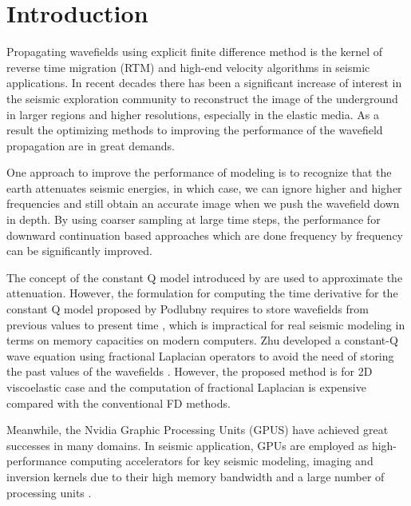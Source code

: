 \documentclass{paris17}
\begin{document}
\section{Introduction}

Propagating wavefields using explicit finite difference method is the kernel of reverse time migration (RTM) and high-end velocity algorithms in seismic applications. In recent decades there has been a significant increase of interest in the seismic exploration community to reconstruct the image of the underground in larger regions and higher resolutions, especially in the elastic media. As a result the optimizing methods to improving the performance of the wavefield propagation are in great demands.




One approach to improve the performance of modeling is to recognize that the earth attenuates seismic energies, in which case, we can ignore higher and higher frequencies and still obtain an accurate image\cite[]{Clapp.sep.111.bob3} when we push the wavefield down in depth. By using coarser sampling at large time steps,  the performance for downward continuation based approaches which are done frequency by frequency can be significantly improved.

The concept of the constant Q model introduced by \cite{Kjartansson.sep.23} are used to approximate the attenuation. However, the formulation for computing the time derivative for the constant Q model proposed by Podlubny requires to store wavefields from previous values to present time \cite[]{podlubny1998fractional}, which is impractical for real seismic modeling in terms on memory capacities on modern computers. Zhu developed a constant-Q wave equation using fractional Laplacian operators to avoid the need of storing the past values of the wavefields \cite[]{zhu2014theory}. However, the proposed method is for 2D viscoelastic case and the computation of fractional Laplacian is expensive compared with the conventional FD methods.

Meanwhile, the Nvidia Graphic Processing Units (GPUS)  have achieved great successes in many domains. In seismic application, GPUs are employed as high-performance computing accelerators for key seismic modeling, imaging and inversion kernels due to their high memory bandwidth and a large number of processing units \cite[]{ohmer2005implementation,he2015gpu}.
\end{document}
